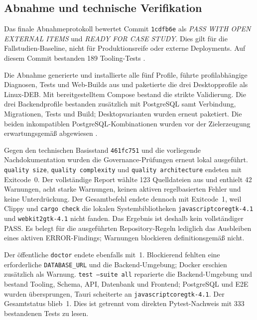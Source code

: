 \subsection{Abnahme und technische Verifikation}
\label{subsec:abnahme-technische-verifikation}

Das finale Abnahmeprotokoll bewertet Commit \texttt{1cdfb6e} als \emph{PASS
WITH OPEN EXTERNAL ITEMS} und \emph{READY FOR CASE STUDY}. Dies gilt für die
Fallstudien-Baseline, nicht für Produktionsreife oder externe Deployments. Auf
diesem Commit bestanden 189 Tooling-Tests
\parencite{kleiveist2026acceptance}.

Die Abnahme generierte und installierte alle fünf Profile, führte
profilabhängige Diagnosen, Tests und Web-Builds aus und paketierte die drei
Desktopprofile als Linux-DEB. Mit bereitgestelltem Compose bestand die strikte
Validierung. Die drei Backendprofile bestanden zusätzlich mit PostgreSQL samt
Verbindung, Migrationen, Tests und Build; Desktopvarianten wurden erneut
paketiert. Die beiden inkompatiblen PostgreSQL-Kombinationen wurden vor der
Zielerzeugung erwartungsgemäß abgewiesen
\parencite{kleiveist2026acceptance}.

Gegen den technischen Basisstand \texttt{461fc751} und die vorliegende
Nachdokumentation wurden die Governance-Prüfungen erneut lokal ausgeführt.
\texttt{quality size}, \texttt{quality complexity} und
\texttt{quality architecture} endeten mit Exitcode~0. Der vollständige Report
wählte 123 Quelldateien aus und enthielt 42 Warnungen, acht starke Warnungen,
keinen aktiven regelbasierten Fehler und keine Unterdrückung. Der Gesamtbefehl
endete dennoch mit Exitcode~1, weil Clippy und \texttt{cargo check} die lokalen
Systembibliotheken \texttt{javascriptcoregtk-4.1} und
\texttt{webkit2gtk-4.1} nicht fanden. Das Ergebnis ist deshalb kein
vollständiger PASS. Es belegt für die ausgeführten Repository-Regeln lediglich
das Ausbleiben eines aktiven ERROR-Findings; Warnungen blockieren
definitionsgemäß nicht.

Der öffentliche \texttt{doctor} endete ebenfalls mit~1. Blockierend fehlten
eine erforderliche \texttt{DATABASE\_URL} und die Backend-Umgebung; Docker
erschien zusätzlich als Warnung. \texttt{test --suite all} reparierte die Backend-Umgebung und
bestand Tooling, Schema, API, Datenbank und Frontend; PostgreSQL und E2E wurden
übersprungen, Tauri scheiterte an
\texttt{javascriptcoregtk-4.1}. Der Gesamtstatus blieb~1. Dies ist getrennt
vom direkten Pytest-Nachweis mit 333 bestandenen Tests zu lesen.

